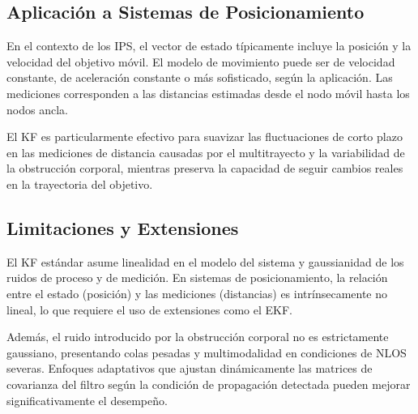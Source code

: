 \subsection{Aplicación a Sistemas de Posicionamiento}

En el contexto de los IPS, el vector de estado típicamente incluye la posición y la velocidad del objetivo móvil. El modelo de movimiento puede ser de velocidad constante, de aceleración constante o más sofisticado, según la aplicación. Las mediciones corresponden a las distancias estimadas desde el nodo móvil hasta los nodos ancla.

El KF es particularmente efectivo para suavizar las fluctuaciones de corto plazo en las mediciones de distancia causadas por el multitrayecto y la variabilidad de la obstrucción corporal, mientras preserva la capacidad de seguir cambios reales en la trayectoria del objetivo.

\subsection{Limitaciones y Extensiones}

El KF estándar asume linealidad en el modelo del sistema y gaussianidad de los ruidos de proceso y de medición. En sistemas de posicionamiento, la relación entre el estado (posición) y las mediciones (distancias) es intrínsecamente no lineal, lo que requiere el uso de extensiones como el EKF.

Además, el ruido introducido por la obstrucción corporal no es estrictamente gaussiano, presentando colas pesadas y multimodalidad en condiciones de NLOS severas. Enfoques adaptativos que ajustan dinámicamente las matrices de covarianza del filtro según la condición de propagación detectada pueden mejorar significativamente el desempeño.


